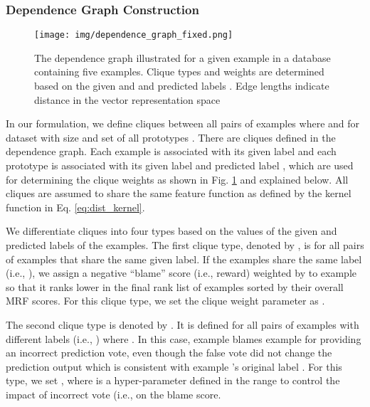 \subsubsection{Dependence Graph Construction}

\begin{figure}[t]
\centering
\texttt{[image: img/dependence\_graph\_fixed.png]}
\caption{The dependence graph illustrated for a given example  in a database containing five examples. Clique types and weights are determined based on the given  and  and predicted labels . Edge lengths indicate distance in the vector representation space}
\label{fig:dependence_graph}
\end{figure}








In our formulation, we define cliques between all pairs of examples  where  and  for dataset  with size  and set of all prototypes . There are  cliques defined in the dependence graph. 
Each example is associated with its given label  and each prototype is associated with its given label  and predicted label , which are used for determining the clique weights as shown in Fig. \ref{fig:dependence_graph} and explained below.
All cliques are assumed to share the same feature function  as defined by the kernel function in Eq. \ref{eq:dist_kernel}. 











We differentiate cliques into four types based on the values of the given and predicted labels of the examples. 
The first clique type, denoted by , is for all pairs of examples  that share the same given label. If the examples share the same label (i.e., ), we assign a negative ``blame'' score (i.e., reward) weighted by  to example  so that it ranks lower in the final rank list of examples sorted by their overall MRF scores. For this clique type, we set the clique weight parameter as . 

The second clique type is denoted by . It is defined for all pairs of examples  with different labels (i.e., ) where . In this case, example  blames example  for providing an incorrect prediction vote, even though the false vote did not change the prediction output  which is consistent with example 's original label . For this type, we set , where  is a hyper-parameter defined in the range  to control the impact of incorrect vote (i.e.,  on the blame score. 







